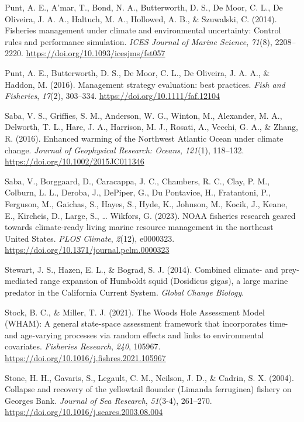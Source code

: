 \documentclass[
  12pt,
]{article}
\newlength{\cslhangindent}
\newenvironment{CSLReferences}[2] %
 {\begin{list}{}{%
  \setlength{\itemindent}{0pt}
  \setlength{\leftmargin}{0pt}
  \setlength{\parsep}{0pt}
  \ifodd #1
   \setlength{\leftmargin}{\cslhangindent}
   \setlength{\itemindent}{-1\cslhangindent}
  \fi
  \setlength{\itemsep}{#2\baselineskip}}}
 {\end{list}}
\begin{document}
\begin{CSLReferences}{1}{2}
Punt, A. E., A'mar, T., Bond, N. A., Butterworth, D. S., De Moor, C. L., De Oliveira, J. A. A., Haltuch, M. A., Hollowed, A. B., \& Szuwalski, C. (2014). Fisheries management under climate and environmental uncertainty: Control rules and performance simulation. \emph{ICES Journal of Marine Science}, \emph{71}(8), 2208--2220. \url{https://doi.org/10.1093/icesjms/fst057}

Punt, A. E., Butterworth, D. S., De Moor, C. L., De Oliveira, J. A. A., \& Haddon, M. (2016). Management strategy evaluation: best practices. \emph{Fish and Fisheries}, \emph{17}(2), 303--334. \url{https://doi.org/10.1111/faf.12104}

Saba, V. S., Griffies, S. M., Anderson, W. G., Winton, M., Alexander, M. A., Delworth, T. L., Hare, J. A., Harrison, M. J., Rosati, A., Vecchi, G. A., \& Zhang, R. (2016). Enhanced warming of the Northwest Atlantic Ocean under climate change. \emph{Journal of Geophysical Research: Oceans}, \emph{121}(1), 118--132. \url{https://doi.org/10.1002/2015JC011346}

Saba, V., Borggaard, D., Caracappa, J. C., Chambers, R. C., Clay, P. M., Colburn, L. L., Deroba, J., DePiper, G., Du Pontavice, H., Fratantoni, P., Ferguson, M., Gaichas, S., Hayes, S., Hyde, K., Johnson, M., Kocik, J., Keane, E., Kircheis, D., Large, S., \ldots{} Wikfors, G. (2023). NOAA fisheries research geared towards climate-ready living marine resource management in the northeast United States. \emph{PLOS Climate}, \emph{2}(12), e0000323. \url{https://doi.org/10.1371/journal.pclm.0000323}

Stewart, J. S., Hazen, E. L., \& Bograd, S. J. (2014). Combined climate- and prey-mediated range expansion of {Humboldt} squid ({Dosidicus} gigas), a large marine predator in the {California Current System}. \emph{Global Change Biology}.

Stock, B. C., \& Miller, T. J. (2021). The {Woods Hole Assessment Model} ({WHAM}): {A} general state-space assessment framework that incorporates time- and age-varying processes via random effects and links to environmental covariates. \emph{Fisheries Research}, \emph{240}, 105967. \url{https://doi.org/10.1016/j.fishres.2021.105967}

Stone, H. H., Gavaris, S., Legault, C. M., Neilson, J. D., \& Cadrin, S. X. (2004). Collapse and recovery of the yellowtail flounder (Limanda ferruginea) fishery on Georges Bank. \emph{Journal of Sea Research}, \emph{51}(3-4), 261--270. \url{https://doi.org/10.1016/j.seares.2003.08.004}


\end{CSLReferences}
\end{document}
